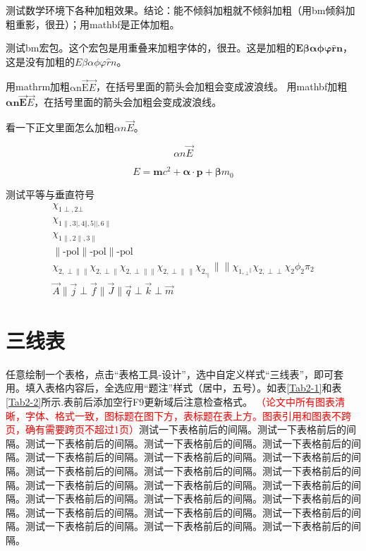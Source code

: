 测试数学环境下各种加粗效果。结论：能不倾斜加粗就不倾斜加粗（用bm倾斜加粗重影，很丑）；用mathbf是正体加粗。

测试bm宏包。这个宏包是用重叠来加粗字体的，很丑。这是加粗的$\bm{E\beta\alpha\phi\varphi \hat r n}$，这是没有加粗的$E\beta\alpha\phi\varphi \hat r n$。

用mathrm加粗$\mathrm{\alpha n \vec{E}}\vec E$，在括号里面的箭头会加粗会变成波浪线。
用mathbf加粗$\mathbf{\alpha n \vec{E}}\vec E$，在括号里面的箭头会加粗会变成波浪线。

看一下正文里面怎么加粗\boldmath$\alpha n \vec E$。

\begin{equation}
  \alpha n \vec E
\end{equation}

$$
E = \mathbf{m} c^2 + \boldsymbol{\alpha} \cdot \mathbf{p} + \boldsymbol{\beta} m_0
$$

测试平等与垂直符号
\begin{equation}
\begin{split}
\chi_{1\perp,2\bot}\\
\chi_{1\parallel,3\vert,4\Vert,5||,6\|}\\
\chi_{1\parallel,2{\scriptstyle\parallel},3{\scriptscriptstyle\parallel}}\\
{\parallel}\text{-pol}{\scriptscriptstyle\parallel}\text{-pol}{\scriptstyle\parallel}\text{-pol}\\
\chi_{2,\perp\parallel\parallel}
\chi_{2,\perp{\scriptscriptstyle\parallel}}
\chi_{2,{\scriptscriptstyle\perp}{\scriptscriptstyle\parallel}{\scriptscriptstyle\parallel}}
\chi_{2,{\scriptscriptstyle\perp}{\scriptscriptstyle\parallel}\,{\scriptscriptstyle\parallel}}
\chi_{2,_\parallel}{\scriptscriptstyle\parallel}{\scriptscriptstyle\parallel}
\chi_{1,{}_\perp{}^\parallel}
\chi_{2,\perp{\scriptscriptstyle\perp}}
\chi_2\phi_2\pi_2       \\
\vec{A}\parallel \vec{j}
\perp \vec{f}
{\scriptstyle\parallel}\vec{J}
{\scriptscriptstyle\parallel}\vec{q}
{\scriptstyle\perp}\vec{k}
{\scriptscriptstyle\perp}\vec{m}
\end{split}
\end{equation}

\section{三线表}
任意绘制一个表格，点击“表格工具-设计”，选中自定义样式“三线表”，即可套用。填入表格内容后，全选应用“题注”样式（居中，五号）。如表\ref{Tab2-1}和表\ref{Tab2-2}所示.表前后添加空行F9更新域后注意检查格式。
\textcolor{red}{（论文中所有图表清晰，字体、格式一致，图标题在图下方，表标题在表上方。图表引用和图表不跨页，确有需要跨页不超过1页）}测试一下表格前后的间隔。测试一下表格前后的间隔。测试一下表格前后的间隔。测试一下表格前后的间隔。测试一下表格前后的间隔。测试一下表格前后的间隔。测试一下表格前后的间隔。测试一下表格前后的间隔。测试一下表格前后的间隔。测试一下表格前后的间隔。测试一下表格前后的间隔。测试一下表格前后的间隔。测试一下表格前后的间隔。测试一下表格前后的间隔。测试一下表格前后的间隔。测试一下表格前后的间隔。测试一下表格前后的间隔。测试一下表格前后的间隔。测试一下表格前后的间隔。测试一下表格前后的间隔。测试一下表格前后的间隔。测试一下表格前后的间隔。测试一下表格前后的间隔。

